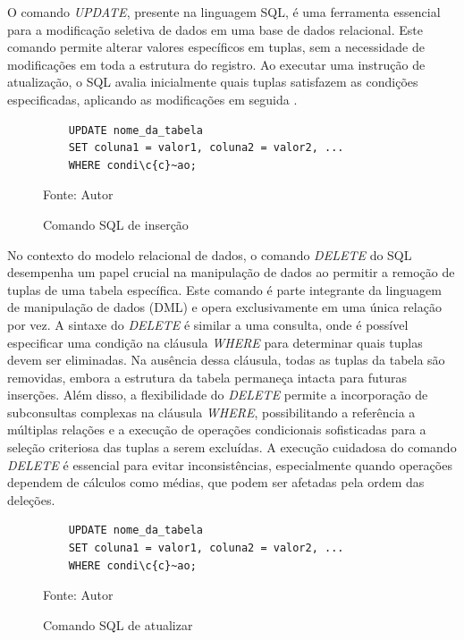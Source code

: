 
O comando \textit{UPDATE}, presente na linguagem SQL, é uma ferramenta essencial para a modificação seletiva de dados em uma base de dados relacional. Este comando permite alterar valores específicos em tuplas, sem a necessidade de modificações em toda a estrutura do registro. Ao executar uma instrução de atualização, o SQL avalia inicialmente quais tuplas satisfazem as condições especificadas, aplicando as modificações em seguida \cite{silberschatz2011database}.

\begin{figure}[h!]
    \centering
    \begin{lstlisting}
    UPDATE nome_da_tabela
    SET coluna1 = valor1, coluna2 = valor2, ...
    WHERE condi\c{c}~ao;
    \end{lstlisting}
    \caption{Comando SQL de inserção}
    Fonte: Autor
    \label{lst:update}
\end{figure}



No contexto do modelo relacional de dados, o comando \textit{DELETE} do SQL desempenha um papel crucial na manipulação de dados ao permitir a remoção de tuplas de uma tabela específica. Este comando é parte integrante da linguagem de manipulação de dados (DML) e opera exclusivamente em uma única relação por vez. A sintaxe do \textit{DELETE} é similar a uma consulta, onde é possível especificar uma condição na cláusula \textit{WHERE} para determinar quais tuplas devem ser eliminadas. Na ausência dessa cláusula, todas as tuplas da tabela são removidas, embora a estrutura da tabela permaneça intacta para futuras inserções. Além disso, a flexibilidade do \textit{DELETE} permite a incorporação de subconsultas complexas na cláusula \textit{WHERE}, possibilitando a referência a múltiplas relações e a execução de operações condicionais sofisticadas para a seleção criteriosa das tuplas a serem excluídas. A execução cuidadosa do comando \textit{DELETE} é essencial para evitar inconsistências, especialmente quando operações dependem de cálculos como médias, que podem ser afetadas pela ordem das deleções\cite{silberschatz2011database}.

\begin{figure}[h!]
    \centering
    \begin{lstlisting}
    UPDATE nome_da_tabela
    SET coluna1 = valor1, coluna2 = valor2, ...
    WHERE condi\c{c}~ao;
    \end{lstlisting}
    \caption{Comando SQL de atualizar}
    Fonte: Autor
    \label{lst:delete}
\end{figure}

